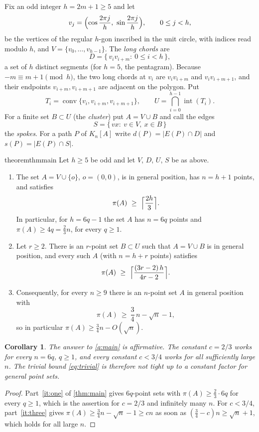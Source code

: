\documentclass[11pt,a4paper]{article}
\theoremstyle{plain}
\newtheorem{corollary}[theorem]{Corollary}
\theoremstyle{definition}
\theoremstyle{remark}
\newcommand{\conv}{\operatorname{conv}}
\newcommand{\inte}{\operatorname{int}}
\newcommand{\pipath}{\pi}
\newcommand{\dP}{d}
\newcommand{\sP}{s}
\begin{document}
Fix an odd integer $h=2m+1\ge5$ and let
\[
 v_j=\Bigl(\cos\frac{2\pi j}{h},\ \sin\frac{2\pi j}{h}\Bigr),\qquad 0\le j<h,
\]
be the vertices of the regular $h$-gon inscribed in the unit circle, with indices read modulo $h$, and $V=\{v_0,\dots,v_{h-1}\}$. The \emph{long chords} are
\[
 D=\{\,v_iv_{i+m}:\ 0\le i<h\,\},
\]
a set of $h$ distinct segments (for $h=5$, the pentagram). Because $-m\equiv m+1\pmod h$, the two long chords at $v_i$ are $v_iv_{i+m}$ and $v_iv_{i+m+1}$, and their endpoints $v_{i+m},v_{i+m+1}$ are adjacent on the polygon. Put
\[
 T_i=\conv\{v_i,v_{i+m},v_{i+m+1}\},\qquad U=\bigcap_{i=0}^{h-1}\inte(T_i).
\]
For a finite set $B\subset U$ (the \emph{cluster}) put $A=V\cup B$ and call the edges
\[
 S=\{\,vx:\ v\in V,\ x\in B\,\}
\]
the \emph{spokes}. For a path $P$ of $K_n[A]$ write $\dP(P)=|E(P)\cap D|$ and $\sP(P)=|E(P)\cap S|$.

\begin{restatable}{theorem}{thmmain}\label{thm:main}
Let $h\ge5$ be odd and let $V$, $D$, $U$, $S$ be as above.
\begin{enumerate}[label=(\arabic*),leftmargin=2.2em]
\item\label{it:one} The set $A=V\cup\{o\}$, $o=(0,0)$, is in general position, has $n=h+1$ points, and satisfies
 \[
  \pipath(A)\ \ge\ \Bigl\lceil\frac{2h}{3}\Bigr\rceil .
 \]
 In particular, for $h=6q-1$ the set $A$ has $n=6q$ points and $\pipath(A)\ge4q=\tfrac23n$, for every $q\ge1$.
\item\label{it:two} Let $r\ge2$. There is an $r$-point set $B\subset U$ such that $A=V\cup B$ is in general position, and every such $A$ (with $n=h+r$ points) satisfies
 \[
  \pipath(A)\ \ge\ \Bigl\lceil\frac{(3r-2)\,h}{4r-2}\Bigr\rceil .
 \]
\item\label{it:three} Consequently, for every $n\ge9$ there is an $n$-point set $A$ in general position with
 \[
  \pipath(A)\ \ge\ \frac34\,n-\sqrt n-1 ,
 \]
 so in particular $\pipath(A)\ge\tfrac34n-O(\sqrt n)$.
\end{enumerate}
\end{restatable}

\begin{corollary}\label{cor:main}
The answer to \cref{q:main} is affirmative. The constant $c=2/3$ works for every $n=6q$, $q\ge1$, and every constant $c<3/4$ works for all sufficiently large $n$. The trivial bound \eqref{eq:trivial} is therefore not tight up to a constant factor for general point sets.
\end{corollary}
\begin{proof}
Part~\ref{it:one} of \cref{thm:main} gives $6q$-point sets with $\pipath(A)\ge\tfrac23\cdot 6q$ for every $q\ge1$, which is the assertion for $c=2/3$ and infinitely many $n$. For $c<3/4$, part~\ref{it:three} gives $\pipath(A)\ge\tfrac34n-\sqrt n-1\ge cn$ as soon as $(\tfrac34-c)n\ge\sqrt n+1$, which holds for all large $n$.
\end{proof}
\end{document}
